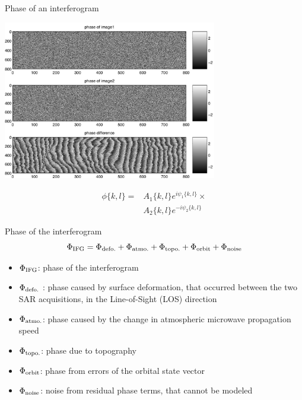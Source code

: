 \documentclass{beamer}
\begin{document}
\begin{frame}{Phase of an interferogram}
    \begin{center}
        \includegraphics[width=0.7\textwidth]{insar_phase.png}
        
        \begin{align*}
            \phi\{k,l\} = & A_1\{k,l\} e^{i\psi_1\{k,l\}} \times \\
                          & A_2\{k,l\} e^{-i\psi_2\{k,l\}}
        \end{align*}
    \end{center}
\end{frame}


\begin{frame}{Phase of the interferogram}
    \[
        \Phi_{\text{IFG}} = \Phi_{\text{defo.}} + \Phi_{\text{atmo.}} + \Phi_{\text{topo.}} + \Phi_{\text{orbit}} + \Phi_{\text{noise}}
    \]
    \begin{itemize}
        \item $\Phi_{\text{IFG}}$: phase of the interferogram 
        \item $\Phi_{\text{defo.}}$ : phase caused by surface deformation, that occurred between the two SAR acquisitions, in the Line-of-Sight (LOS) direction
        \item $\Phi_{\text{atmo.}}$: phase caused by the change in atmospheric microwave propagation speed
        \item $\Phi_{\text{topo.}}$: phase due to topography
        \item $\Phi_{\text{orbit}}$: phase from errors of the orbital state vector
        \item $\Phi_{\text{noise}}$: noise from residual phase terms, that cannot be modeled
    \end{itemize}    
\end{frame}
\end{document}
